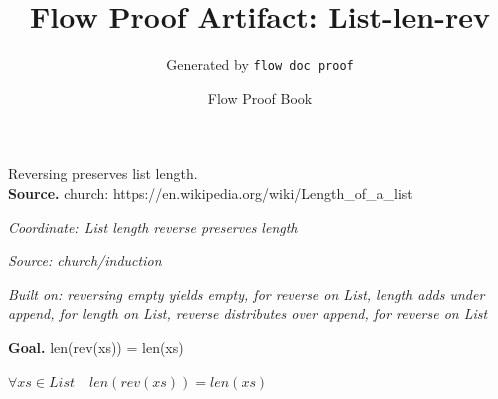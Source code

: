 \documentclass[11pt]{article}
\title{Flow Proof Artifact: List-len-rev}
\author{Generated by \texttt{flow doc proof}}
\date{Flow Proof Book}
\theoremstyle{definition}
\begin{document}
\maketitle
Reversing preserves list length.\\[0.5em]
\textbf{Source.} church: https://en.wikipedia.org/wiki/Length\_of\_a\_list\\[0.5em]
\bigskip
{}\par
\smallskip\noindent\textit{Coordinate: List \cdot length \cdot reverse preserves length}\par
\smallskip\noindent\textit{Source: church/induction}\par
\smallskip\noindent\textit{Built on: reversing empty yields empty, for reverse on List, length adds under append, for length on List, reverse distributes over append, for reverse on List}\par
\medskip
\noindent\textbf{Goal.} len(rev(xs)) = len(xs)\par
\noindent$\displaystyle \forall xs \in List\quad len(rev(xs)) = len(xs)$\par
\medskip
\noindent
\end{document}

